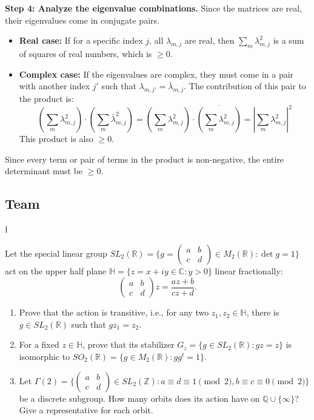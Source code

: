 \begin{solution}
\textbf{Step 4: Analyze the eigenvalue combinations.}
Since the matrices are real, their eigenvalues come in conjugate pairs.
\begin{itemize}
    \item \textbf{Real case:} If for a specific index $j$, all $\lambda_{m,j}$ are real, then $\sum_m \lambda_{m,j}^2$ is a sum of squares of real numbers, which is $\geq 0$.
    \item \textbf{Complex case:} If the eigenvalues are complex, they must come in a pair with another index $j'$ such that $\lambda_{m,j'} = \bar{\lambda}_{m,j}$.
    The contribution of this pair to the product is:
    \[ \left( \sum_m \lambda_{m,j}^2 \right) \cdot \left( \sum_m \bar{\lambda}_{m,j}^2 \right) = \left( \sum_m \lambda_{m,j}^2 \right) \cdot \overline{\left( \sum_m \lambda_{m,j}^2 \right)} = \left| \sum_m \lambda_{m,j}^2 \right|^2 \]
    This product is also $\geq 0$.
\end{itemize}
Since every term or pair of terms in the product is non-negative, the entire determinant must be $\geq 0$.
\end{solution}

\subsection*{Team}
\begin{exercise}
\l\label{2014:7}

\label{algebra:2014:7}Let the special linear group $SL_2(\mathbb{R}) = \{ g = \begin{pmatrix} a & b \\ c & d \end{pmatrix} \in M_2(\mathbb{R}) : \det g = 1 \}$ act on the upper half plane $\mathbb{H} = \{ z = x + iy \in \mathbb{C} : y > 0 \}$ linear fractionally:
\[ \begin{pmatrix} a & b \\ c & d \end{pmatrix} z = \frac{az + b}{cz + d}. \]
\begin{enumerate}
    \item Prove that the action is transitive, i.e., for any two $z_1, z_2 \in \mathbb{H}$, there is $g \in SL_2(\mathbb{R})$ such that $gz_1 = z_2$.
    \item For a fixed $z \in \mathbb{H}$, prove that its stabilizer $G_z = \{ g \in SL_2(\mathbb{R}) : gz = z \}$ is isomorphic to $SO_2(\mathbb{R}) = \{ g \in M_2(\mathbb{R}) : g g^t = 1 \}$.
    \item Let $\Gamma(2) = \{ \begin{pmatrix} a & b \\ c & d \end{pmatrix} \in SL_2(\mathbb{Z}) : a \equiv d \equiv 1 \pmod 2, b \equiv c \equiv 0 \pmod 2 \}$ be a discrete subgroup. How many orbits does its action have on $\mathbb{Q} \cup \{ \infty \}$? Give a representative for each orbit.
\end{enumerate}
\end{exercise}

